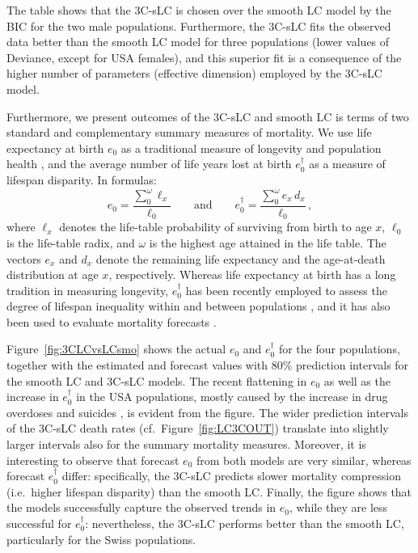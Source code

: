 \documentclass[Thesis]{subfiles}
\begin{document}
The table shows that the 3C-sLC is chosen over the smooth LC model by the BIC for the two male populations. Furthermore, the 3C-sLC fits the observed data better than the smooth LC model for three populations (lower values of Deviance, except for USA females), and this superior fit is a consequence of the higher number of parameters (effective dimension) employed by the 3C-sLC model.

Furthermore, we present outcomes of the 3C-sLC and smooth LC is terms of two standard and complementary summary measures of mortality. We use life expectancy at birth $e_0$ as a traditional measure of longevity and population health \citep{preston2001demogr}, and the average number of life years lost at birth $e^{\dagger}_0$ \citep{vaupel2003decomposing} as a measure of lifespan disparity. In formulas:
\begin{equation}\label{eq:e0ed}
e_0= \frac{\sum_{0}^{\omega} \ell_x}{\ell_0} \qquad \mbox{and} \qquad e^{\dagger}_0= \frac{\sum_{0}^{\omega} e_x \, d_x}{\ell_0} \, ,
\end{equation}
where $\ell_x$ denotes the life-table probability of surviving from birth to age $x$, $\ell_0$ is the life-table radix, and $\omega$ is the highest age attained in the life table. The vectors $e_x$ and $d_x$ denote the remaining life expectancy and the age-at-death distribution at age $x$, respectively. Whereas life expectancy at birth has a long tradition in measuring longevity, $e^{\dagger}_0$ has been recently employed to assess the degree of lifespan inequality within and between populations \cite[see, e.g.,][]{shkolnikov2011losses,vaupel2011life,aburto2018lifespan}, and it has also been used to evaluate mortality forecasts \citep{bohk2017lifespan,camarda2019smooth}.

Figure~\ref{fig:3CLCvsLCsmo} shows the actual $e_0$ and $e^{\dagger}_0$ for the four populations, together with the estimated and forecast values with 80\% prediction intervals for the smooth LC and 3C-sLC models. The recent flattening in $e_0$ as well as the increase in $e^{\dagger}_0$ in the USA populations, mostly caused by the increase in drug overdoses and suicides \citep{barbieri2018drug}, is evident from the figure. The wider prediction intervals of the 3C-sLC death rates (cf.~Figure~\ref{fig:LC3COUT}) translate into slightly larger intervals also for the summary mortality measures. Moreover, it is interesting to observe that forecast $e_0$ from both models are very similar, whereas forecast $e^{\dagger}_0$ differ: specifically, the 3C-sLC predicts slower mortality compression (i.e.~higher lifespan disparity) than the smooth LC. Finally, the figure shows that the models successfully capture the observed trends in $e_0$, while they are less successful for $e^{\dagger}_0$: nevertheless, the 3C-sLC performs better than the smooth LC, particularly for the Swiss populations.  
\end{document}
